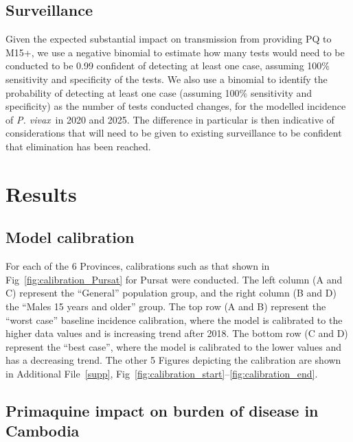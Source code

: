 \documentclass[doublespacing]{bmcart}
\newcommand{\pv}{\textit{P. vivax}}
\begin{document}
\subsection*{Surveillance}
Given the expected substantial impact on transmission from providing PQ to M15+, we use a negative binomial to estimate how many tests would need to be conducted to be 0.99 confident of detecting at least one case, assuming 100\% sensitivity and specificity of the tests. We also use a binomial to identify the probability of detecting at least one case (assuming 100\% sensitivity and specificity) as the number of tests conducted changes, for the modelled incidence of \pv~in 2020 and 2025. The difference in particular is then indicative of considerations that will need to be given to existing surveillance to be confident that elimination has been reached.


\section*{Results}

\subsection*{Model calibration}
For each of the 6 Provinces, calibrations such as that shown in Fig~\ref{fig:calibration_Pursat} for Pursat were conducted. The left column (A and C) represent the ``General'' population group, and the right column (B and D) the ``Males 15 years and older'' group. The top row (A and B) represent the ``worst case'' baseline incidence calibration, where the model is calibrated to the higher data values and is increasing trend after 2018. The bottom row (C and D) represent the ``best case'', where the model is calibrated to the lower values and has a decreasing trend. The other 5 Figures depicting the calibration are shown in Additional File~\ref{supp}, Fig~\ref{fig:calibration_start}--\ref{fig:calibration_end}.

\subsection*{Primaquine impact on burden of disease in Cambodia} \label{sec:impact}
\end{document}

